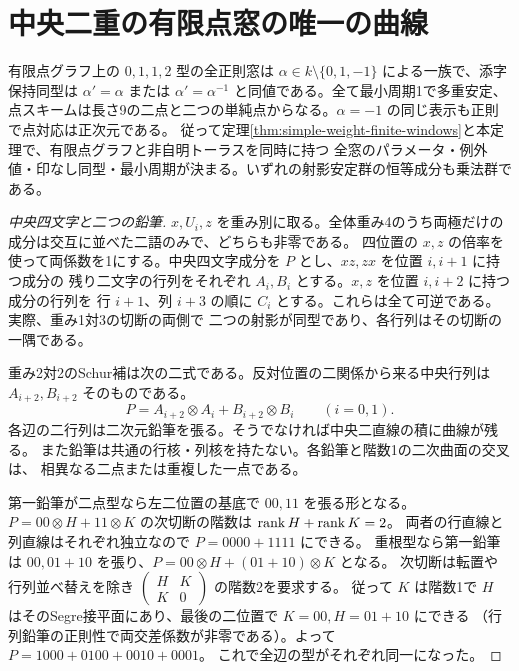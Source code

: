 \section{中央二重の有限点窓の唯一の曲線}
\label{sec:double-middle-finite-windows}
\begin{theorem}\label{thm:double-middle-finite-windows}
有限点グラフ上の $0,1,1,2$ 型の全正則窓は
$\alpha\in k\setminus\{0,1,-1\}$ による一族で、添字保持同型は
$\alpha'=\alpha$ または $\alpha'=\alpha^{-1}$ と同値である。全て最小周期1で多重安定、
点スキームは長さ9の二点と二つの単純点からなる。$\alpha=-1$ の同じ表示も正則で点対応は正次元である。
従って定理\ref{thm:simple-weight-finite-windows}と本定理で、有限点グラフと非自明トーラスを同時に持つ
全窓のパラメータ・例外値・印なし同型・最小周期が決まる。いずれの射影安定群の恒等成分も乗法群である。
\end{theorem}
\begin{proof}[中央四文字と二つの鉛筆]
$x,U_i,z$ を重み別に取る。全体重み4のうち両極だけの成分は交互に並べた二語のみで、どちらも非零である。
四位置の $x,z$ の倍率を使って両係数を1にする。中央四文字成分を $P$ とし、$xz,zx$ を位置 $i,i+1$ に持つ成分の
残り二文字の行列をそれぞれ $A_i,B_i$ とする。$x,z$ を位置 $i,i+2$ に持つ成分の行列を
行 $i+1$、列 $i+3$ の順に $C_i$ とする。これらは全て可逆である。実際、重み1対3の切断の両側で
二つの射影が同型であり、各行列はその切断の一隅である。

重み2対2のSchur補は次の二式である。反対位置の二関係から来る中央行列は
$A_{i+2},B_{i+2}$ そのものである。
\[
 P=A_{i+2}\otimes A_i+B_{i+2}\otimes B_i\qquad (i=0,1).
\]
各辺の二行列は二次元鉛筆を張る。そうでなければ中央二直線の積に曲線が残る。
また鉛筆は共通の行核・列核を持たない。各鉛筆と階数1の二次曲面の交叉は、
相異なる二点または重複した一点である。

第一鉛筆が二点型なら左二位置の基底で $00,11$ を張る形となる。
$P=00\otimes H+11\otimes K$ の次切断の階数は $\operatorname{rank} H+\operatorname{rank} K=2$。
両者の行直線と列直線はそれぞれ独立なので $P=0000+1111$ にできる。
重根型なら第一鉛筆は $00,01+10$ を張り、$P=00\otimes H+(01+10)\otimes K$ となる。
次切断は転置や行列並べ替えを除き
$\left(\begin{smallmatrix}H&K\\K&0\end{smallmatrix}\right)$ の階数2を要求する。
従って $K$ は階数1で $H$ はそのSegre接平面にあり、最後の二位置で $K=00,H=01+10$ にできる
（行列鉛筆の正則性で両交差係数が非零である）。よって $P=1000+0100+0010+0001$。
これで全辺の型がそれぞれ同一になった。
\end{proof}

